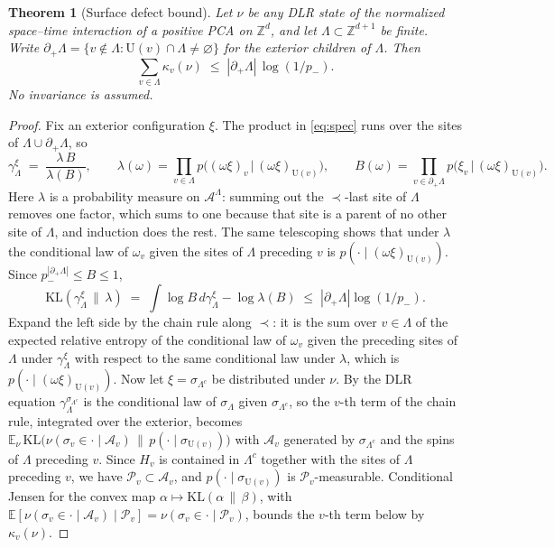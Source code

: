 \documentclass[11pt]{article}
\theoremstyle{plain}
\newtheorem{theorem}{Theorem}[section]
\theoremstyle{definition}
\theoremstyle{remark}
\newcommand{\A}{\mathcal{A}}
\newcommand{\Z}{\mathbb{Z}}
\newcommand{\E}{\mathbb{E}}
\newcommand{\Lam}{\Lambda}
\newcommand{\Ue}{\mathrm{U}}
\begin{document}
\begin{theorem}[Surface defect bound]
\label{thm:defect}
Let $\nu$ be any DLR state of the normalized space--time interaction of a positive PCA on $\Z^d$, and let $\Lam\subset\Z^{d+1}$ be finite. Write $\partial_+\Lam=\{v\notin\Lam:\Ue(v)\cap\Lam\neq\varnothing\}$ for the exterior children of $\Lam$. Then
\begin{equation}
\sum_{v\in\Lam}\kappa_v(\nu)\;\le\;|\partial_+\Lam|\,\log(1/p_-).
\label{eq:surface}
\end{equation}
No invariance is assumed.
\end{theorem}

\begin{proof}
Fix an exterior configuration $\xi$. The product in \eqref{eq:spec} runs over the sites of $\Lam\cup\partial_+\Lam$, so
\[
\gamma^\xi_\Lam\;=\;\frac{\lambda\,B}{\lambda(B)},\qquad
\lambda(\omega)=\prod_{v\in\Lam}p\bigl((\omega\xi)_v\,\big|\,(\omega\xi)_{\Ue(v)}\bigr),\qquad
B(\omega)=\prod_{v\in\partial_+\Lam}p\bigl(\xi_v\,\big|\,(\omega\xi)_{\Ue(v)}\bigr).
\]
Here $\lambda$ is a probability measure on $\A^\Lam$: summing out the $\prec$-last site of $\Lam$ removes one factor, which sums to one because that site is a parent of no other site of $\Lam$, and induction does the rest. The same telescoping shows that under $\lambda$ the conditional law of $\omega_v$ given the sites of $\Lam$ preceding $v$ is $p(\cdot\mid(\omega\xi)_{\Ue(v)})$. Since $p_-^{|\partial_+\Lam|}\le B\le1$,
\[
\mathrm{KL}(\gamma^\xi_\Lam\,\|\,\lambda)\;=\;\int\log B\,d\gamma^\xi_\Lam-\log\lambda(B)\;\le\;|\partial_+\Lam|\log(1/p_-).
\]
Expand the left side by the chain rule along $\prec$: it is the sum over $v\in\Lam$ of the expected relative entropy of the conditional law of $\omega_v$ given the preceding sites of $\Lam$ under $\gamma^\xi_\Lam$ with respect to the same conditional law under $\lambda$, which is $p(\cdot\mid(\omega\xi)_{\Ue(v)})$. Now let $\xi=\sigma_{\Lam^c}$ be distributed under $\nu$. By the DLR equation $\gamma^{\sigma_{\Lam^c}}_\Lam$ is the conditional law of $\sigma_\Lam$ given $\sigma_{\Lam^c}$, so the $v$-th term of the chain rule, integrated over the exterior, becomes
$\E_\nu\,\mathrm{KL}\bigl(\nu(\sigma_v\in\cdot\mid\mathcal A_v)\,\|\,p(\cdot\mid\sigma_{\Ue(v)})\bigr)$ with $\mathcal A_v$ generated by $\sigma_{\Lam^c}$ and the spins of $\Lam$ preceding $v$. Since $H_v$ is contained in $\Lam^c$ together with the sites of $\Lam$ preceding $v$, we have $\mathcal P_v\subset\mathcal A_v$, and $p(\cdot\mid\sigma_{\Ue(v)})$ is $\mathcal P_v$-measurable. Conditional Jensen for the convex map $\alpha\mapsto\mathrm{KL}(\alpha\,\|\,\beta)$, with $\E[\nu(\sigma_v\in\cdot\mid\mathcal A_v)\mid\mathcal P_v]=\nu(\sigma_v\in\cdot\mid\mathcal P_v)$, bounds the $v$-th term below by $\kappa_v(\nu)$.
\end{proof}
\end{document}
